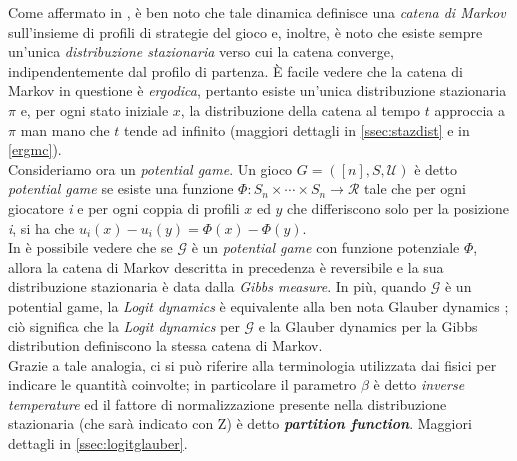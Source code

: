 Come affermato in \cite{blume1993statistical}, è ben noto che tale dinamica definisce una \textit{catena di Markov} sull’insieme di profili di strategie del gioco e, inoltre, è noto che esiste sempre un’unica \textit{distribuzione stazionaria} verso cui la catena converge, indipendentemente dal profilo di partenza. È facile vedere che la catena di Markov in questione è \textit{ergodica}, pertanto esiste un’unica distribuzione stazionaria $\pi$ e, per ogni stato iniziale $x$, la distribuzione della catena al tempo $t$ approccia a $\pi$ man mano che $t$ tende ad infinito (maggiori dettagli in \ref{ssec:stazdist} e in \ref{ergmc}).\\
Consideriamo ora un \textit{potential game}. Un gioco $G = ([n], S, \mathcal{U})$ è detto \textit{potential game} se esiste una funzione $\Phi : S_n \times \cdots \times S_n \rightarrow \mathcal{R}$ tale che per ogni giocatore \textit{i} e per ogni coppia di profili $x$ ed $y$ che differiscono solo per la posizione \textit{i}, si ha che $u_i(x) - u_i(y) = \Phi(x) - \Phi(y)$.\\
In \cite{blume1993statistical} è possibile vedere che se $\mathcal{G}$ è un \textit{potential game} con funzione potenziale $\Phi$, allora la catena di Markov descritta in precedenza è reversibile e la sua distribuzione stazionaria è data dalla \textit{Gibbs measure}. In più, quando $\mathcal{G}$ è un potential game, la \textit{Logit dynamics} è equivalente alla ben nota Glauber dynamics \cite{martinelli1999lectures}; ciò significa che la \textit{Logit dynamics} per $\mathcal{G}$ e la Glauber dynamics per la Gibbs distribution definiscono la stessa catena di Markov.\\ Grazie a tale analogia, ci si può riferire alla terminologia utilizzata dai fisici per indicare le quantità coinvolte; in particolare il parametro $\beta$ è detto \textit{inverse temperature} ed il fattore di normalizzazione presente nella distribuzione stazionaria (che sarà indicato con Z) è detto \textbf{\textit{partition function}}. Maggiori dettagli in \ref{ssec:logitglauber}.\\

